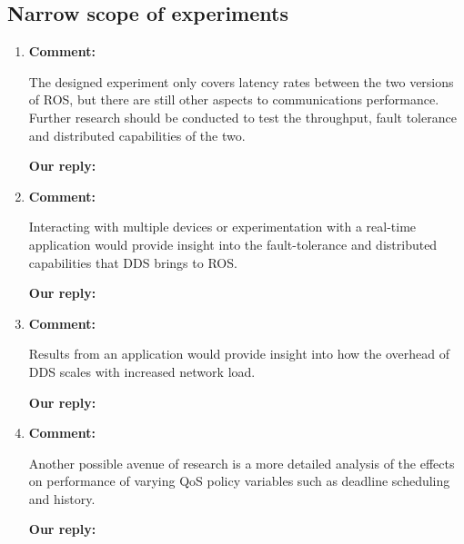 \documentclass{article}
\begin{document}
\subsection{Narrow scope of experiments}
\begin{enumerate}

\item \begin{flushleft}
    \textbf{Comment:}
  \end{flushleft}
  The designed experiment only covers latency rates between the two versions of ROS, but there are still other aspects to communications performance. Further research should be conducted to test the throughput, fault tolerance and distributed capabilities of the
  two.

  \begin{flushleft}
    \textbf{Our reply:}
  \end{flushleft}


\item \begin{flushleft}
    \textbf{Comment:}
  \end{flushleft}
  Interacting with multiple devices or experimentation with a real-time application would provide insight into the fault-tolerance and distributed capabilities that DDS brings to ROS.

  \begin{flushleft}
    \textbf{Our reply:}
  \end{flushleft}


\item \begin{flushleft}
    \textbf{Comment:}
  \end{flushleft}
  Results from an application would provide insight into how the overhead of DDS scales with increased network load.

  \begin{flushleft}
    \textbf{Our reply:}
  \end{flushleft}


\item \begin{flushleft}
    \textbf{Comment:}
  \end{flushleft}
  Another possible avenue of research is a more detailed analysis of the effects on performance of varying QoS policy variables such as deadline scheduling and history.

  \begin{flushleft}
    \textbf{Our reply:}
  \end{flushleft}



\end{enumerate}
\end{document}
